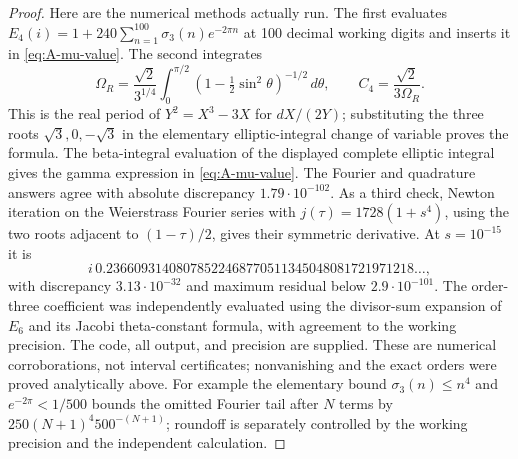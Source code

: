 \begin{proof}
Here are the numerical methods actually run.  The first evaluates
$E_4(i)=1+240\sum_{n=1}^{100}\sigma_3(n)e^{-2\pi n}$ at 100
decimal working digits and inserts it in \eqref{eq:A-mu-value}.
The second integrates
\[
\Omega_R=\frac{\sqrt2}{3^{1/4}}
\int_0^{\pi/2}(1-\tfrac12\sin^2\theta)^{-1/2}\,d\theta,
\qquad C_4=\frac{\sqrt2}{3\Omega_R}.
\]
This is the real period of $Y^2=X^3-3X$ for $dX/(2Y)$; substituting
the three roots $\sqrt3,0,-\sqrt3$ in the elementary elliptic-integral
change of variable proves the formula.  The beta-integral evaluation
of the displayed complete elliptic integral gives the gamma
expression in \eqref{eq:A-mu-value}.  The Fourier and quadrature
answers agree with absolute discrepancy $1.79\cdot10^{-102}$.
As a third check, Newton iteration on the Weierstrass Fourier series
with $j(\tau)=1728(1+s^4)$, using the two roots adjacent to
$(1-\tau)/2$, gives their symmetric derivative.  At $s=10^{-15}$ it
is
\[
i\,0.23660931408078522468770511345048081721971218\ldots,
\]
with discrepancy $3.13\cdot10^{-32}$ and maximum residual below
$2.9\cdot10^{-101}$.  The order-three coefficient was independently
evaluated using the divisor-sum expansion of $E_6$ and its Jacobi
theta-constant formula, with agreement to the working precision.
The code, all output, and precision are supplied.  These are numerical
corroborations, not interval certificates; nonvanishing and the exact
orders were proved analytically above.  For example the elementary
bound $\sigma_3(n)\le n^4$ and $e^{-2\pi}<1/500$ bounds the omitted
Fourier tail after $N$ terms by
$250(N+1)^4 500^{-(N+1)}$; roundoff is separately controlled by
the working precision and the independent calculation.
\end{proof}

